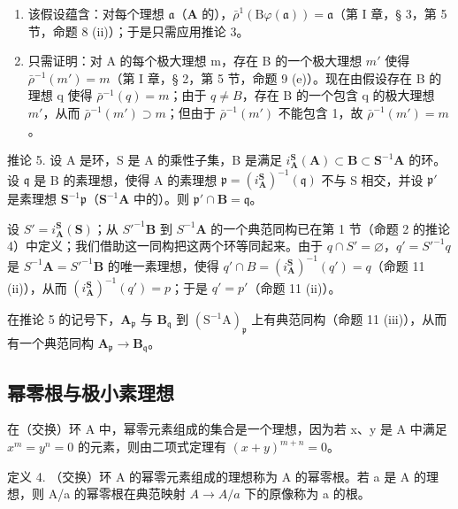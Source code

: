 \begin{enumerate}
\def\labelenumi{(\roman{enumi})}
\item
  该假设蕴含：对每个理想 \(\mathfrak{a}\)（\(\mathbf{A}\) 的），\(\bar{\rho}^{1}(\mathrm{B}\varphi (\mathfrak{a})) = \mathfrak{a}\)（第 I 章，§ 3，第 5 节，命题 8 (ii)）；于是只需应用推论 3。

\item
  只需证明：对 A 的每个极大理想 m，存在 B 的一个极大理想 \(m'\) 使得 \(\bar{\rho}^{-1}(m') = m\)（第 I 章，§ 2，第 5 节，命题 9 (e)）。现在由假设存在 B 的理想 q 使得 \(\bar{\rho}^{-1}(q) = m\)；由于 \(q \neq B\)，存在 B 的一个包含 q 的极大理想 \(m'\)，从而 \(\bar{\rho}^{-1}(m') \supset m\)；但由于 \(\bar{\rho}^{-1}(m')\) 不能包含 1，故 \(\bar{\rho}^{-1}(m') = m\)。
\end{enumerate}

推论 5. 设 A 是环，S 是 A 的乘性子集，B 是满足 \(i_{\mathbf{A}}^{\mathbf{S}}(\mathbf{A}) \subset \mathbf{B} \subset \mathbf{S}^{-1}\mathbf{A}\) 的环。设 \(\mathfrak{q}\) 是 B 的素理想，使得 A 的素理想 \(\mathfrak{p} = (i_{\mathbf{A}}^{\mathbf{S}})^{-1}(\mathfrak{q})\) 不与 S 相交，并设 \(\mathfrak{p}'\) 是素理想 \(\mathbf{S}^{-1}\mathfrak{p}\)（\(\mathbf{S}^{-1}\mathbf{A}\) 中的）。则 \(\mathfrak{p}' \cap \mathbf{B} = \mathfrak{q}\)。

设 \(S' = i_{\mathbf{A}}^{\mathbf{S}}(\mathbf{S})\)；从 \(S'^{-1}\mathbf{B}\) 到 \(S^{-1}\mathbf{A}\) 的一个典范同构已在第 1 节（命题 2 的推论 4）中定义；我们借助这一同构把这两个环等同起来。由于 \(q \cap S' = \varnothing\)，\(q' = S'^{-1}q\) 是 \(S^{-1}\mathbf{A} = S'^{-1}\mathbf{B}\) 的唯一素理想，使得 \(q' \cap B = (i_{\mathbf{A}}^{\mathbf{S}})^{-1}(q') = q\)（命题 11 (ii)），从而 \((i_{\mathbf{A}}^{\mathbf{S}})^{-1}(q') = p\)；于是 \(q' = p'\)（命题 11 (ii)）。

在推论 5 的记号下，\(\mathbf{A}_{\mathfrak{p}}\) 与 \(\mathbf{B}_{\mathfrak{q}}\) 到 \((\mathrm{S}^{-1}\mathrm{A})_{\mathfrak{p}}\) 上有典范同构（命题 11 (iii)），从而有一个典范同构 \(\mathbf{A}_{\mathfrak{p}} \to \mathbf{B}_{\mathfrak{q}}\)。

\subsection{幂零根与极小素理想}

在（交换）环 A 中，幂零元素组成的集合是一个理想，因为若 x、y 是 A 中满足 \(x^{m} = y^{n} = 0\) 的元素，则由二项式定理有 \((x + y)^{m+n} = 0\)。

定义 4. （交换）环 A 的幂零元素组成的理想称为 A 的幂零根。若 a 是 A 的理想，则 A/a 的幂零根在典范映射 \(A \rightarrow A/a\) 下的原像称为 a 的根。

